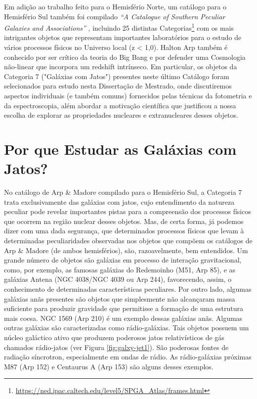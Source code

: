 Em adição ao trabalho feito para o Hemisfério Norte, um catálogo para o Hemisfério Sul também foi compilado \textit{“A Catalogue of Southern Peculiar Galaxies and Associations”} \cite{arp1987catalogue}, incluindo 25 distintas Categorias\footnote{\url{https://ned.ipac.caltech.edu/level5/SPGA_Atlas/frames.html}} com os mais intrigantes objetos que representam importantes laboratórios para o estudo de vários processos físicos no Universo local (z < 1,0). Halton Arp também é conhecido por ser crítico da teoria do Big Bang e por defender uma Cosmologia não-linear que incorpora um redshift intrínseco. Em particular, os objetos da Categoria 7 ("Galáxias com Jatos") presentes neste último Catálogo foram selecionados para estudo nesta Dissertação de Mestrado, onde discutiremos aspectos individuais (e também comuns) fornecidos pelas técnicas da fotometria e da espectroscopia, além abordar a motivação científica que justificou a nossa escolha de explorar as propriedades nucleares e extranucleares desses objetos.

\section{Por que Estudar as Galáxias com Jatos?}

No catálogo de Arp \& Madore compilado para o Hemisfério Sul, a Categoria 7 trata exclusivamente das galáxias com jatos, cujo entendimento da natureza peculiar pode revelar importantes pistas para a compreensão dos processos físicos que ocorrem na região nuclear desses objetos. Mas, de certa forma, já podemos dizer com uma dada segurança, que determinados processos físicos que levam à determinadas peculiaridades observadas nos objetos que compõem os catálogos de Arp \& Madore (de ambos hemisférios), são, razoavelmente, bem entendidos. Um grande número de objetos são galáxias em processo de interação gravitacional, como, por exemplo, as famosas  galáxias do Redemoinho (M51, Arp 85), e as galáxias Antena (NGC 4038/NGC 4039 ou Arp 244), favorecendo, assim, o conhecimento de determinadas características peculiares. Por outro lado, algumas galáxias anãs presentes são objetos que simplesmente não alcançaram massa suficiente para produzir gravidade que permitisse a formação de uma estrutura mais coesa. NGC 1569 (Arp 210) é um exemplo dessas galáxias anãs. Algumas outras galáxias são caracterizadas como rádio-galáxias. Tais objetos possuem um núcleo galáctico ativo que produzem poderosos jatos relativísticos de gás chamados rádio-jatos (ver Figura \ref{fig:galxy-jet1}). São poderosas fontes de radiação síncrotron, especialmente em ondas de rádio. As rádio-galáxias próximas M87 (Arp 152) e Centaurus A (Arp 153) são alguns desses exemplos.

